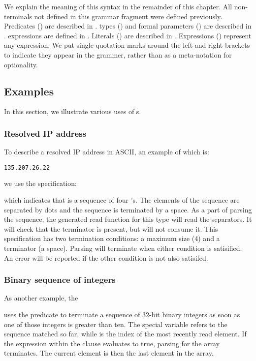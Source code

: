 \noindent
We explain the meaning of this syntax in the remainder of this chapter.
All non-terminals not defined in this grammar fragment were
defined previously.
Predicates () are described in .
\padsl{} types () and formal parameters ()
are described in .
\padsl{} expressions  are defined in .
Literals ()  are described in
.
Expressions () represent any \C{} expression.
We put single quotation marks around the left and right brackets to
indicate they appear in the grammer, rather than as a meta-notation
for optionality.

\subsection{Examples}
In this section, we illustrate various uses of \Parray{}s.
\subsubsection{Resolved IP address}
To describe a resolved IP address in ASCII, an example of which is:
\begin{center}
\begin{verbatim}
135.207.26.22
\end{verbatim}
\end{center}
we use the specification:

%
\noindent
which indicates that \Parray{}  is a sequence of
four 's.  The elements of the sequence are separated by
dots and the sequence is terminated by a space.  As a part of parsing
the sequence, the generated read function for this type will read the
separators.  It will check that the terminator is present, but will
not consume it.  This specification has two termination conditions: a
maximum size (4) and a terminator (a space).  Parsing will terminate
when either condition is satisified.  An error will be reported if the
other condition is not also satisifed.

\subsubsection{Binary sequence of integers}
As another example, the \Parray{} 

%
\noindent
uses the \Plast{} predicate to terminate a
sequence of 32-bit binary integers as soon as one of those integers is
greater than ten.  The special variable  refers to the
sequence matched so far, while  is the index of the most
recently read element.  If the expression within the \Plast{} clause
evaluates to true, parsing for the array terminates.  The current
element is then the last element in the array.

